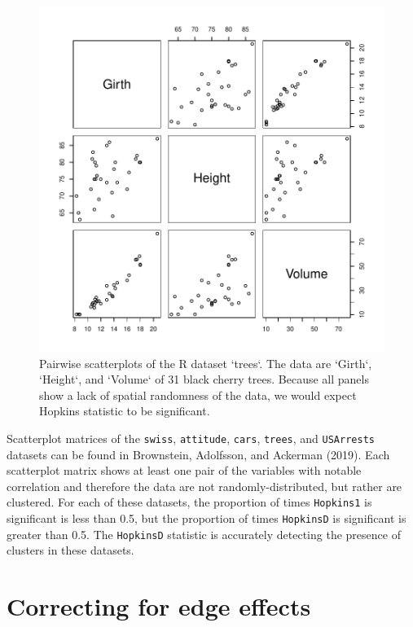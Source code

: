 \begin{figure}

{\centering \includegraphics[width=0.7\linewidth]{RJ-2022-055_files/figure-latex/trees-1} 

}

\caption{Pairwise scatterplots of the R dataset `trees`. The data are `Girth`, `Height`, and `Volume` of 31 black cherry trees. Because all panels show a lack of spatial randomness of the data, we would expect Hopkins statistic to be significant.}\label{fig:trees}
\end{figure}

Scatterplot matrices of the \texttt{swiss}, \texttt{attitude}, \texttt{cars}, \texttt{trees}, and \texttt{USArrests} datasets can be found in Brownstein, Adolfsson, and Ackerman (2019). Each scatterplot matrix shows at least one pair of the variables with notable correlation and therefore the data are not randomly-distributed, but rather are clustered. For each of these datasets, the proportion of times \texttt{Hopkins1} is significant is less than 0.5, but the proportion of times \texttt{HopkinsD} is significant is greater than 0.5. The \texttt{HopkinsD} statistic is accurately detecting the presence of clusters in these datasets.

\hypertarget{correcting-for-edge-effects}{%
\section{Correcting for edge effects}\label{correcting-for-edge-effects}}

